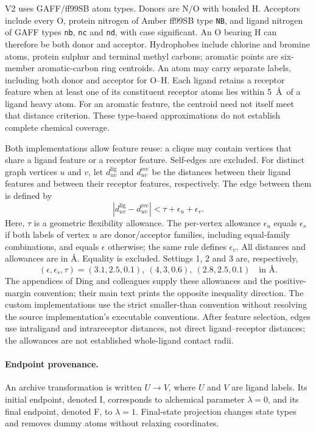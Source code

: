 \documentclass{article}
\begin{document}
V2 uses GAFF/ff99SB atom types. Donors are N/O with bonded H. Acceptors include every O, protein nitrogen of Amber ff99SB type \texttt{NB}, and ligand nitrogen of GAFF types \texttt{nb}, \texttt{nc} and \texttt{nd}, with case significant. An O bearing H can therefore be both donor and acceptor. Hydrophobes include chlorine and bromine atoms, protein sulphur and terminal methyl carbons; aromatic points are six-member aromatic-carbon ring centroids. An atom may carry separate labels, including both donor and acceptor for O--H. Each ligand retains a receptor feature when at least one of its constituent receptor atoms lies within 5~\AA\ of a ligand heavy atom. For an aromatic feature, the centroid need not itself meet that distance criterion. These type-based approximations do not establish complete chemical coverage.

Both implementations allow feature reuse: a clique may contain vertices that share a ligand feature or a receptor feature. Self-edges are excluded. For distinct graph vertices \(u\) and \(v\), let \(d^{\mathrm{lig}}_{uv}\) and \(d^{\mathrm{rec}}_{uv}\) be the distances between their ligand features and between their receptor features, respectively. The edge between them is defined by
\[
 |d^{\mathrm{lig}}_{uv}-d^{\mathrm{rec}}_{uv}|
 <\tau+\epsilon_u+\epsilon_v.
\]
Here, \(\tau\) is a geometric flexibility allowance. The per-vertex allowance \(\epsilon_u\) equals \(\epsilon_s\) if both labels of vertex \(u\) are donor/acceptor families, including equal-family combinations, and equals \(\epsilon\) otherwise; the same rule defines \(\epsilon_v\). All distances and allowances are in \AA. Equality is excluded. Settings 1, 2 and 3 are, respectively,
\[
 (\epsilon,\epsilon_s,\tau)
 =(3.1,2.5,0.1),\ (4,3,0.6),\ (2.8,2.5,0.1)
 \quad\text{in \AA}.
\]
The appendices of Ding and colleagues supply these allowances and the positive-margin convention; their main text prints the opposite inequality direction. The custom implementations use the strict smaller-than convention without resolving the source implementation's executable conventions. After feature selection, edges use intraligand and intrareceptor distances, not direct ligand--receptor distances; the allowances are not established whole-ligand contact radii.\cite{P}

\paragraph{Endpoint provenance.}
An archive transformation is written \(U\to V\), where \(U\) and \(V\) are ligand labels. Its initial endpoint, denoted I, corresponds to alchemical parameter \(\lambda=0\), and its final endpoint, denoted F, to \(\lambda=1\). Final-state projection changes state types and removes dummy atoms without relaxing coordinates.
\end{document}
